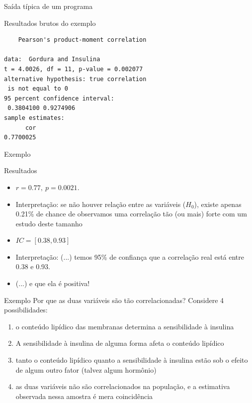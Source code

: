 \documentclass{beamer}
\begin{document}
\begin{frame}[fragile]{Saída típica de um programa}
  \begin{exampleblock}{Resultados brutos do exemplo}
    \footnotesize
\begin{verbatim}
	Pearson's product-moment correlation

data:  Gordura and Insulina
t = 4.0026, df = 11, p-value = 0.002077
alternative hypothesis: true correlation
 is not equal to 0
95 percent confidence interval:
 0.3804100 0.9274906
sample estimates:
      cor
0.7700025
\end{verbatim}
  \end{exampleblock}
\end{frame}

\begin{frame}{Exemplo}
  \begin{exampleblock}{Resultados}
    \begin{itemize}
      \footnotesize
    \item $r = 0.77,\ p=0.0021$.
    \item Interpretação: se não houver relação entre as variáveis
      ($H_0$), existe apenas 0.21\% de chance de observamos uma
      correlação tão (ou mais) forte com um estudo deste tamanho

      \bigskip
      \bigskip
    \item $IC = [0.38, 0.93]$
    \item Interpretação: (...) temos 95\% de confiança que a correlação real está entre 0.38 e 0.93.
    \item (...) e que ela é positiva!
    \end{itemize}
  \end{exampleblock}
\end{frame}

\begin{frame}{Exemplo}
  \small
  Por que as duas variáveis são tão correlacionadas? Considere 4
  possibilidades:
  \bigskip
  \begin{enumerate}
    \footnotesize
  \item o conteúdo lipídico das membranas \alert<1>{determina} a
    sensibilidade à insulina
  \item A sensibilidade à insulina de alguma forma \alert<2>{afeta} o conteúdo lipídico
  \item tanto o conteúdo lipídico quanto a sensibilidade à insulina
    estão sob o efeito de \alert<3>{algum outro} fator (talvez algum hormônio)
  \item as duas variáveis não são correlacionados na população, e a
    estimativa observada nessa amostra é \alert<4>{mera coincidência}
  \end{enumerate}
\end{frame}
\end{document}
